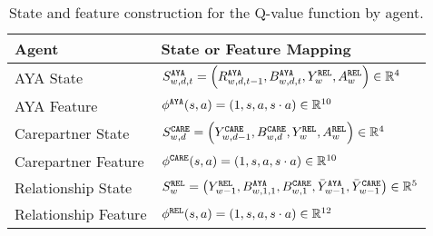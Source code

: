 \begin{table}[hpt]
    \centering
    \caption{State and feature construction for the Q-value function by agent.}
    \label{tab:state_feature}
    \begin{tabular}{l|l}
        \toprule
        Agent & State or Feature Mapping \\
        \midrule
        AYA State & $S_{w, d, t}^{\tiny\texttt{AYA}} = \left(R_{w, d, t-1}^{\tiny\texttt{AYA}}, B_{w, d, t}^{\tiny\texttt{AYA}}, Y_{w}^{\tiny\texttt{REL}}, A_{w}^{\tiny\texttt{REL}}\right) \in \mathbb{R}^{4}$ \\
        AYA Feature & $\phi^{\tiny\texttt{AYA}}(s, a) = (1, s, a, s \cdot a) \in \mathbb{R}^{10}$ \\
        \midrule
        Carepartner State & $S_{w, d}^{\tiny\texttt{CARE}} = \left(Y_{w, d-1}^{\tiny\texttt{CARE}}, B_{w, d}^{\tiny\texttt{CARE}}, Y_{w}^{\tiny\texttt{REL}}, A_{w}^{\tiny\texttt{REL}}\right) \in \mathbb{R}^{4}$ \\ 
        Carepartner Feature & $\phi^{\tiny\texttt{CARE}}(s, a) = (1, s, a, s \cdot a) \in \mathbb{R}^{10}$ \\
        \midrule
        Relationship State & $S_{w}^{\tiny\texttt{REL}} = \left(Y_{w-1}^{\tiny\texttt{REL}}, B_{w, 1, 1}^{\tiny\texttt{AYA}}, B_{w, 1}^{\tiny\texttt{CARE}}, \bar{Y}_{w-1}^{\tiny\texttt{AYA}}, \bar{Y}_{w-1}^{\tiny\texttt{CARE}}\right) \in \mathbb{R}^{5}$ \\
        Relationship Feature & $\phi^{\tiny\texttt{REL}}(s, a) = (1, s, a, s \cdot a) \in \mathbb{R}^{12}$ \\
        \bottomrule
    \end{tabular}
\end{table}


